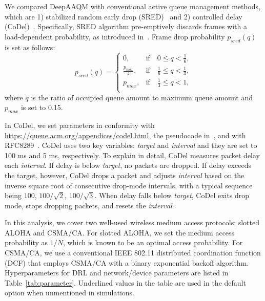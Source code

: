 \documentclass[journal]{IEEEtran}
\begin{document}
We compared DeepAAQM with conventional active queue management methods, which are 1) stabilized random early drop (SRED)~\cite{Ott1999} and
2) controlled delay (CoDel)~\cite{Nichols2012}.
Specifically, SRED algorithm pre-emptively discards frames with a load-dependent probability, as introduced in~\cite{Ott1999}. Frame drop probability $p_{sred}(q)$ is set as follows:
\begin{equation}
    p_{sred}(q) = \left\{ {
    \begin{array}{*{20}{l}}
        \displaystyle{0}, & {\textrm{if} \quad 0 \leq q < \frac{1}{6},} \\
        \displaystyle{\frac{p_{max}}{4}}, & {\textrm{if} \quad \frac{1}{6} \leq q < \frac{1}{3},} \\
        \displaystyle{p_{max}}, & {\textrm{if} \quad \frac{1}{3} \leq q < 1,} \\
    \end{array}} \right.
\label{eq:sred}
\end{equation}
where $q$ is the ratio of occupied queue amount to maximum queue amount and $p_{max}$ is set to 0.15. 

In CoDel, we set parameters in conformity with \url{https://queue.acm.org/appendices/codel.html}, the pseudocode in~\cite{Nichols2012}, and with RFC8289~\cite{rfc8289}. CoDel uses two key variables: \textit{target} and \textit{interval} and they are set to 100 ms and 5 ms, respectively. To explain in detail, CoDel measures packet delay each \textit{interval}. If delay is below \textit{target}, no packets are dropped. If delay exceeds the target, however, CoDel drops a packet and adjusts \textit{interval} based on the inverse square root of consecutive drop-mode intervals, with a typical sequence being $100$, $100/\sqrt{2}$, $100/\sqrt{3}$. When delay falls below \textit{target}, CoDel exits drop mode, stops dropping packets, and resets the \textit{interval}.


In this analysis, we cover two well-used wireless medium access protocols; slotted ALOHA and CSMA/CA. For slotted ALOHA, we set the medium access probability as $1/N$, which is known to be an optimal access probability. For CSMA/CA, we use a conventional IEEE 802.11 distributed coordination function (DCF) that employs CSMA/CA with a binary exponential backoff algorithm. Hyperparameters for DRL and network/device parameters are listed in Table~\ref{tab:parameter}. Underlined values in the table are used in the default option when unmentioned in simulations.
\end{document}
